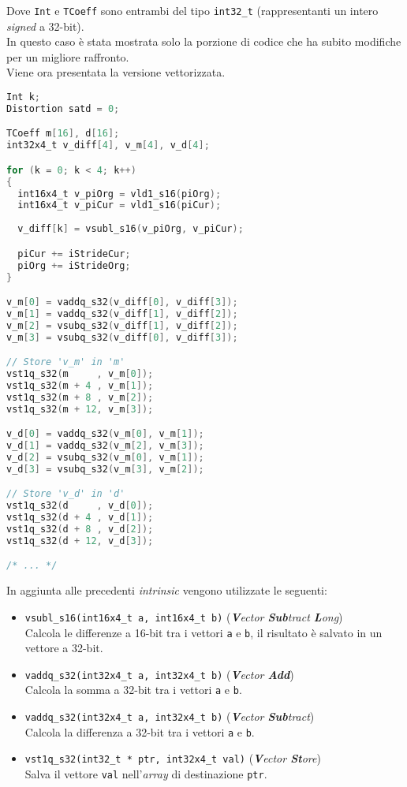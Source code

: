 Dove \verb|Int| e \verb|TCoeff| sono entrambi del tipo \verb|int32_t| 
(rappresentanti un intero \emph{signed} a 32-bit).\\

In questo caso è stata mostrata solo la porzione di codice che ha subito 
modifiche per un migliore raffronto.\\

Viene ora presentata la versione vettorizzata.

\begin{lstlisting}[language=C]
Int k;
Distortion satd = 0;

TCoeff m[16], d[16];
int32x4_t v_diff[4], v_m[4], v_d[4];

for (k = 0; k < 4; k++)
{
  int16x4_t v_piOrg = vld1_s16(piOrg);
  int16x4_t v_piCur = vld1_s16(piCur);
  
  v_diff[k] = vsubl_s16(v_piOrg, v_piCur);

  piCur += iStrideCur;
  piOrg += iStrideOrg;
}

v_m[0] = vaddq_s32(v_diff[0], v_diff[3]);
v_m[1] = vaddq_s32(v_diff[1], v_diff[2]);
v_m[2] = vsubq_s32(v_diff[1], v_diff[2]);
v_m[3] = vsubq_s32(v_diff[0], v_diff[3]);

// Store 'v_m' in 'm'
vst1q_s32(m     , v_m[0]);
vst1q_s32(m + 4 , v_m[1]);
vst1q_s32(m + 8 , v_m[2]);
vst1q_s32(m + 12, v_m[3]);

v_d[0] = vaddq_s32(v_m[0], v_m[1]);
v_d[1] = vaddq_s32(v_m[2], v_m[3]);
v_d[2] = vsubq_s32(v_m[0], v_m[1]);
v_d[3] = vsubq_s32(v_m[3], v_m[2]);

// Store 'v_d' in 'd'
vst1q_s32(d     , v_d[0]);
vst1q_s32(d + 4 , v_d[1]);
vst1q_s32(d + 8 , v_d[2]);
vst1q_s32(d + 12, v_d[3]);

/* ... */
\end{lstlisting}

In aggiunta alle precedenti \emph{intrinsic} vengono utilizzate le seguenti:

\begin{itemize}
  \item \verb|vsubl_s16(int16x4_t a, int16x4_t b)| (\emph{\textbf{V}ector 
    \textbf{Sub}tract \textbf{L}ong})\\
      Calcola le differenze a 16-bit tra i vettori \verb|a| e \verb|b|, il 
      risultato è salvato in un vettore a 32-bit.
  \item \verb|vaddq_s32(int32x4_t a, int32x4_t b)| (\emph{\textbf{V}ector 
    \textbf{Add}})\\
      Calcola la somma a 32-bit tra i vettori \verb|a| e \verb|b|.
  \item \verb|vaddq_s32(int32x4_t a, int32x4_t b)| (\emph{\textbf{V}ector 
    \textbf{Sub}tract})\\
      Calcola la differenza a 32-bit tra i vettori \verb|a| e \verb|b|.
  \item \verb|vst1q_s32(int32_t * ptr, int32x4_t val)| (\emph{\textbf{V}ector 
    \textbf{St}ore})\\
      Salva il vettore \verb|val| nell'\emph{array} di destinazione \verb|ptr|.
\end{itemize}

